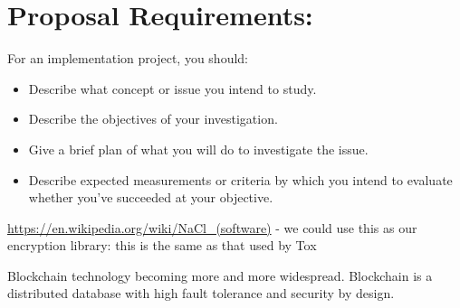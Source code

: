 \documentclass[12pt]{article}
\begin{document}
	
	
	\pagebreak %
	
	
	\pagebreak
	
    \section{Proposal Requirements:}
    For an implementation project, you should:
    \begin{itemize}
        \item Describe what concept or issue you intend to study. 
        \item Describe the objectives of your investigation. 
        \item Give a brief plan of what you will do to investigate the issue. 
        \item Describe expected measurements  or  criteria  by  which  you
            intend  to  evaluate whether you've succeeded at your objective.
    \end{itemize}

    \url{https://en.wikipedia.org/wiki/NaCl_(software)}
    - we could use this as our encryption library: this is the same as that used
      by Tox

    Blockchain technology becoming more and more widespread. Blockchain is a
    distributed database with high fault tolerance and security by design.
    
\end{document}

